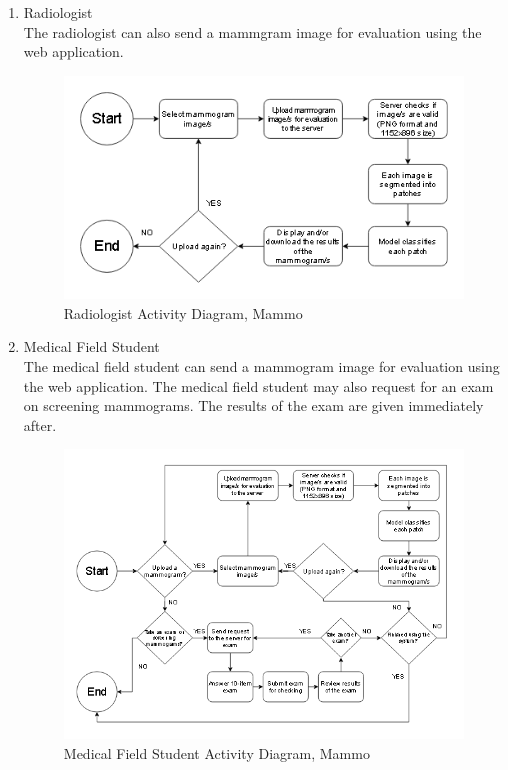 \begin{enumerate}
	\item{Radiologist} \\
	The radiologist can also send a mammgram image for evaluation using the web application.

\begin{figure}[h]
	\centering
  	\includegraphics[scale=0.75]{images/radiologist.png}
	 \caption{Radiologist Activity Diagram, Mammo}
  	\label{fig:radiologist}
\end{figure}
\clearpage

	\item{Medical Field Student} \\
	The medical field student can send a mammogram image for evaluation using the web application. The medical field student may also request for an exam on screening mammograms. The results of the exam are given immediately after.

\begin{figure}[h]
	\centering
  	\includegraphics[scale=0.75]{images/medicalFieldStudent.png}
	 \caption{Medical Field Student Activity Diagram, Mammo}
  	\label{fig:medicalFieldStudent}
\end{figure}
\end{enumerate}
\clearpage

